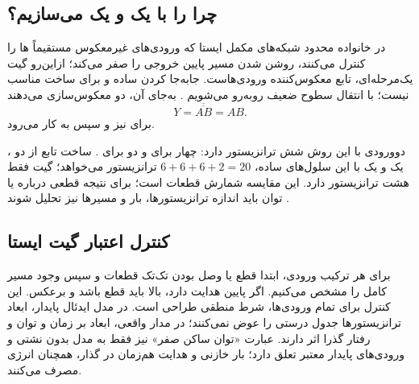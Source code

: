\subsection{چرا  را با یک  و یک  می‌سازیم؟}
در خانواده محدود شبکه‌های مکمل ایستا که ورودی‌های غیرمعکوس مستقیماً
ها را کنترل می‌کنند، روشن شدن مسیر پایین خروجی را صفر می‌کند؛
ازاین‌رو گیت یک‌مرحله‌ای، تابع معکوس‌کننده ورودی‌هاست.
جابه‌جا کردن ساده  و  برای ساخت  مناسب نیست؛
با انتقال سطوح ضعیف روبه‌رو می‌شویم \cite[صفحه چاپی ۱۴]{weste}.
به‌جای آن، دو معکوس‌سازی می‌دهند
\[
 Y=\overline{\overline{AB}}=AB.
\]
برای  نیز  و سپس  به کار می‌رود.

 دوورودی با این روش شش ترانزیستور دارد: چهار برای 
و دو برای . ساخت تابع  از دو ، یک 
و یک  با این سلول‌های ساده، \(6+6+6+2=20\)
ترانزیستور می‌خواهد؛ گیت  فقط هشت ترانزیستور دارد.
این مقایسه شمارش قطعات است؛ برای نتیجه قطعی درباره  یا توان باید
اندازه ترانزیستورها، بار و مسیرها نیز تحلیل شوند \cite[شکل ]{weste}.

\subsection{کنترل اعتبار گیت ایستا}
برای هر ترکیب ورودی، ابتدا قطع یا وصل بودن تک‌تک قطعات و سپس وجود مسیر کامل
را مشخص می‌کنیم. اگر پایین هدایت دارد، بالا باید قطع باشد و برعکس.
این کنترل برای تمام ورودی‌ها، شرط منطقی طراحی است.
در مدل ایدئال پایدار، ابعاد ترانزیستورها جدول درستی را عوض نمی‌کنند؛
در مدار واقعی، ابعاد بر زمان و توان و رفتار گذرا اثر دارند.
عبارت «توان ساکن صفر» نیز فقط به مدل بدون نشتی و ورودی‌های پایدار معتبر تعلق دارد؛
بار خازنی و هدایت هم‌زمان در گذار، همچنان انرژی مصرف می‌کنند.
